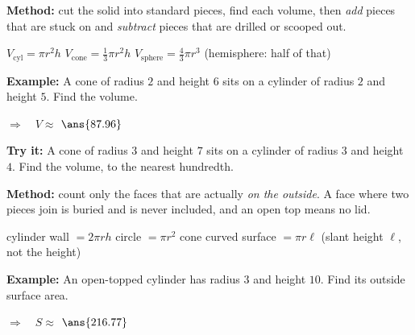 \documentclass[12pt]{article}
\begin{document}


\begin{formulabox}
\textbf{Method:} cut the solid into standard pieces, find each volume, then \emph{add} pieces that are stuck on and \emph{subtract} pieces that are drilled or scooped out.\par
$V_{\text{cyl}} = \pi r^2 h$ \quad $V_{\text{cone}} = \frac{1}{3}\pi r^2 h$ \quad $V_{\text{sphere}} = \frac{4}{3}\pi r^3$ \quad (hemisphere: half of that)
\end{formulabox}

\begin{examplebox}
\textbf{Example:} \quad A cone of radius $2$ and height $6$ sits on a cylinder of radius $2$ and height $5$. Find the volume.

$\Rightarrow\quad V \approx$ $\ans{87.96}$
\end{examplebox}

\begin{tryitbox}
\textbf{Try it:} \quad A cone of radius $3$ and height $7$ sits on a cylinder of radius $3$ and height $4$. Find the volume, to the nearest hundredth.\\[2pt]
\end{tryitbox}


\begin{formulabox}
\textbf{Method:} count only the faces that are actually \emph{on the outside}. A face where two pieces join is buried and is never included, and an open top means no lid.\par
cylinder wall $= 2\pi r h$ \quad circle $= \pi r^2$ \quad cone curved surface $= \pi r \ell$ (slant height $\ell$, not the height)
\end{formulabox}

\begin{examplebox}
\textbf{Example:} \quad An open-topped cylinder has radius $3$ and height $10$. Find its outside surface area.

$\Rightarrow\quad S \approx$ $\ans{216.77}$
\end{examplebox}
\end{document}
